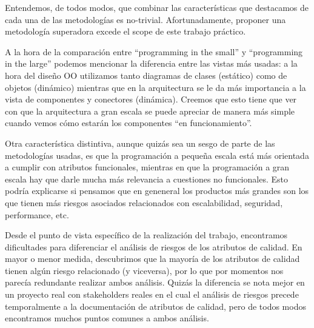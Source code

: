 \documentclass[a4paper, 10pt, twoside]{article}
\begin{document}
Entendemos, de todos modos, que combinar las características que destacamos de cada una de las metodologías es no-trivial. Afortunadamente, proponer una metodología
superadora excede el scope de este trabajo práctico.

A la hora de la comparación entre ``programming in the small'' y ``programming in the large'' podemos mencionar la diferencia entre las vistas más usadas: a la hora del 
diseño OO utilizamos tanto diagramas de clases (estático) como de objetos (dinámico) mientras que en la arquitectura se le da más importancia a la vista de
componentes y conectores (dinámica). Creemos que esto tiene que ver con que la arquitectura a gran escala se puede apreciar de manera más simple cuando vemos
cómo estarán los componentes ``en funcionamiento''.

Otra característica distintiva, aunque quizás sea un sesgo de parte de las metodologías usadas, es que la programación a pequeña escala está más orientada
a cumplir con atributos funcionales, mientras en que la programación a gran escala hay que darle mucha más relevancia a cuestiones no funcionales. Esto podría explicarse
si pensamos que en geneneral los productos más grandes son los que tienen más riesgos asociados relacionados con escalabilidad, seguridad, performance, etc.

Desde el punto de vista específico de la realización del trabajo, encontramos dificultades para diferenciar el análisis de riesgos de los atributos de calidad.
En mayor o menor medida, descubrimos que la mayoría de los atributos de calidad tienen algún riesgo relacionado (y viceversa), por lo que por momentos nos 
parecía redundante realizar ambos análisis. Quizás la diferencia se nota mejor en un proyecto real con stakeholders reales en el cual el análisis de riesgos
precede temporalmente a la documentación de atributos de calidad, pero de todos modos encontramos muchos puntos comunes a ambos análisis.
\end{document}
